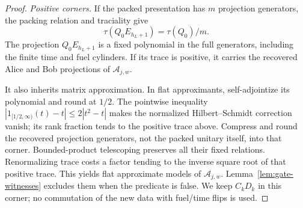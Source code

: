 \begin{proof}
\emph{Positive corners.} If the packed presentation has $m$ projection generators, the packing relation and traciality give
\[
 \tau(Q_0E_{h_L+1})=\tau(Q_0)/m.
\]
The projection $Q_0E_{h_L+1}$ is a fixed polynomial in the full generators, including the finite time and fuel cylinders. If its trace is positive, it carries the recovered Alice and Bob projections of $\mathcal A_{j,w}$.

It also inherits matrix approximation. In flat approximants, self-adjointize its polynomial and round at $1/2$. The pointwise inequality $|1_{[1/2,\infty)}(t)-t|\le2|t^2-t|$ makes the normalized Hilbert--Schmidt correction vanish; its rank fraction tends to the positive trace above. Compress and round the recovered projection generators, not the packed unitary itself, into that corner. Bounded-product telescoping preserves all their fixed relations. Renormalizing trace costs a factor tending to the inverse square root of that positive trace. This yields flat approximate models of $\mathcal A_{j,w}$. Lemma~\ref{lem:gate-witnesses} excludes them when the predicate is false. We keep $C_kD_k$ in this corner; no commutation of the new data with fuel/time flips is used.
\end{proof}

